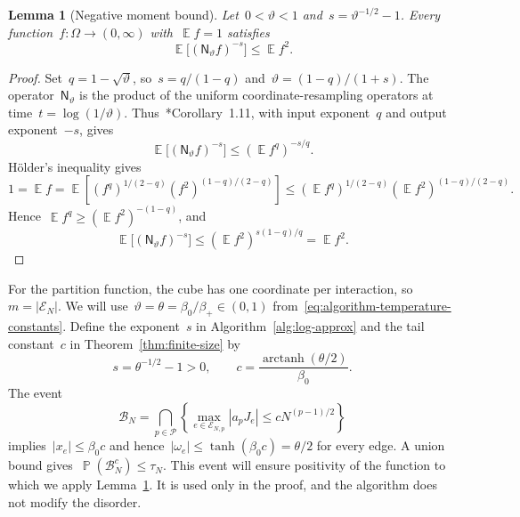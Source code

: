 \documentclass[letterpaper,11pt,reqno]{amsart}
\renewcommand{\leq}{\leqslant}
\renewcommand{\geq}{\geqslant}
\DeclareMathOperator{\E}{\mathds{E}}
\DeclareMathOperator{\pr}{\mathds{P}}
\newtheorem{lemma}[theorem]{Lemma}
\begin{document}
\begin{lemma}[Negative moment bound]\label{lem:reverse-hypercontractivity}
Let~$0<\vartheta<1$ and~$s=\vartheta^{-1/2}-1$. Every function~$f:\Omega\to(0,\infty)$ with~$\E f=1$ satisfies
\begin{equation}\label{eq:reverse-hypercontractivity}
\E\bigl[(\mathsf N_\vartheta f)^{-s}\bigr]\leq\E f^2.
\end{equation}
\end{lemma}
\begin{proof}
Set~$q=1-\sqrt\vartheta$, so~$s=q/(1-q)$ and~$\vartheta=(1-q)/(1+s)$. The operator~$\mathsf N_\vartheta$ is the product of the uniform coordinate-resampling operators at time~$t=\log(1/\vartheta)$. Thus~\cite{MOS13}*{Corollary~1.11}, with input exponent~$q$ and output exponent~$-s$, gives
\begin{equation*}
\E\bigl[(\mathsf N_\vartheta f)^{-s}\bigr]
\leq(\E f^q)^{-s/q}.
\end{equation*}
H\"older's inequality gives
\begin{equation*}
1=\E f
=\E\!\left[(f^q)^{1/(2-q)}(f^2)^{(1-q)/(2-q)}\right]
\leq(\E f^q)^{1/(2-q)}(\E f^2)^{(1-q)/(2-q)}.
\end{equation*}
Hence~$\E f^q\geq(\E f^2)^{-(1-q)}$, and
\begin{equation*}
\E\bigl[(\mathsf N_\vartheta f)^{-s}\bigr]
\leq(\E f^2)^{s(1-q)/q}=\E f^2.
\end{equation*}
\end{proof}

For the partition function, the cube has one coordinate per interaction, so~$m=|\mathcal E_N|$. We will use~$\vartheta=\theta=\beta_0/\beta_+\in(0,1)$ from~\eqref{eq:algorithm-temperature-constants}. Define the exponent~$s$ in Algorithm~\ref{alg:log-approx} and the tail constant~$c$ in Theorem~\ref{thm:finite-size} by
\begin{equation}\label{eq:lower-tail-constants}
s=\theta^{-1/2}-1>0,\qquad c=\frac{\operatorname{arctanh}(\theta/2)}{\beta_0}.
\end{equation}
The event
\begin{equation}\label{eq:bounded-coupling-event}
\mathcal B_N=\bigcap_{p\in\mathcal P}
\left\{\max_{e\in\mathcal E_{N,p}}|a_pJ_e|\leq cN^{(p-1)/2}\right\}
\end{equation}
implies~$|x_e|\leq\beta_0c$ and hence~$|\omega_e|\leq\tanh(\beta_0c)=\theta/2$ for every edge. A union bound gives~$\pr(\mathcal B_N^c)\leq\tau_N$. This event will ensure positivity of the function to which we apply Lemma~\ref{lem:reverse-hypercontractivity}. It is used only in the proof, and the algorithm does not modify the disorder.
\end{document}
